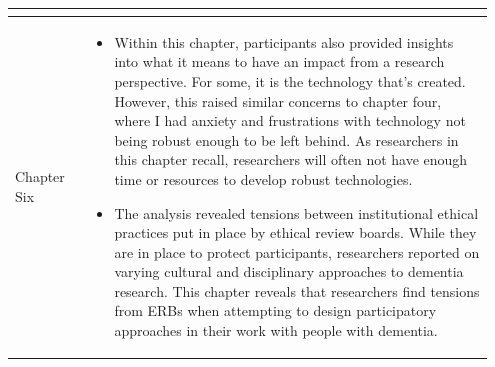 \begin{table}[htp]
\begin{tabular}{p{0.15\linewidth} | p{0.8\linewidth}}
\begin{itemize}
      \end{itemize}
       \\ \hline
       Chapter Six &
    \begin{itemize}
          \item Within this chapter, participants also provided insights into what it means to have an impact from a research perspective. For some, it is the technology that's created. However, this raised similar concerns to chapter four, where I had anxiety and frustrations with technology not being robust enough to be left behind. As researchers in this chapter recall, researchers will often not have enough time or resources to develop robust technologies.

          \item The analysis revealed tensions between institutional ethical practices put in place by ethical review boards. While they are in place to protect participants, researchers reported on varying cultural and disciplinary approaches to dementia research. This chapter reveals that researchers find tensions from ERBs when attempting to design participatory approaches in their work with people with dementia.

      \end{itemize}
    \end{tabular}
    \label{chapterRQ2}
\end{table}


